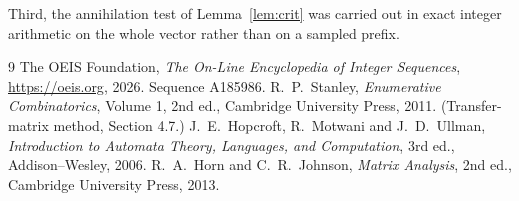 \documentclass[11pt,a4paper]{article}
\theoremstyle{plain}
\theoremstyle{definition}
\begin{document}
Third, the annihilation test of Lemma~\ref{lem:crit} was carried out in exact integer
arithmetic on the whole vector rather than on a sampled prefix.

\begin{thebibliography}{9}
 The OEIS Foundation, \emph{The On-Line Encyclopedia of Integer
Sequences}, \url{https://oeis.org}, 2026. Sequence A185986.
 R.~P.~Stanley, \emph{Enumerative Combinatorics}, Volume 1, 2nd ed.,
Cambridge University Press, 2011. (Transfer-matrix method, Section 4.7.)
 J.~E.~Hopcroft, R.~Motwani and J.~D.~Ullman, \emph{Introduction to Automata
Theory, Languages, and Computation}, 3rd ed., Addison--Wesley, 2006.
 R.~A.~Horn and C.~R.~Johnson, \emph{Matrix Analysis}, 2nd ed., Cambridge
University Press, 2013.
\end{thebibliography}
\end{document}
